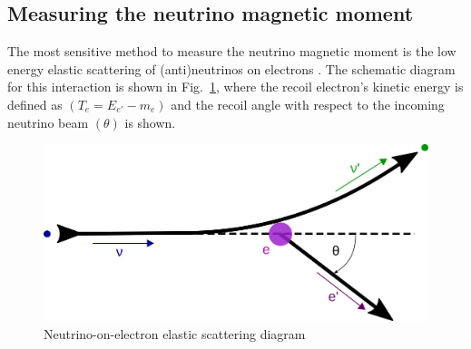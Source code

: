 \subsection{Measuring the neutrino magnetic moment}\label{sec:MeasuringNuMM}
The most sensitive method to measure the neutrino magnetic moment is the low energy elastic scattering of (anti)neutrinos on electrons \cite{nuElmagInt2015.pdf}. The schematic diagram for this interaction is shown in Fig.~\ref{fig:NuoneDiagram}, where the recoil electron's kinetic energy is defined as $\left(T_e=E_{e\prime}-m_e\right)$ and the recoil angle with respect to the incoming neutrino beam $\left(\theta\right)$ is shown.
\begin{figure}[hbtp]
\centering
\includegraphics[width=0.55\linewidth]{Plots/NuMM/NuoneInteraction.png}
\caption{Neutrino-on-electron elastic scattering diagram}
\label{fig:NuoneDiagram}
\end{figure}

